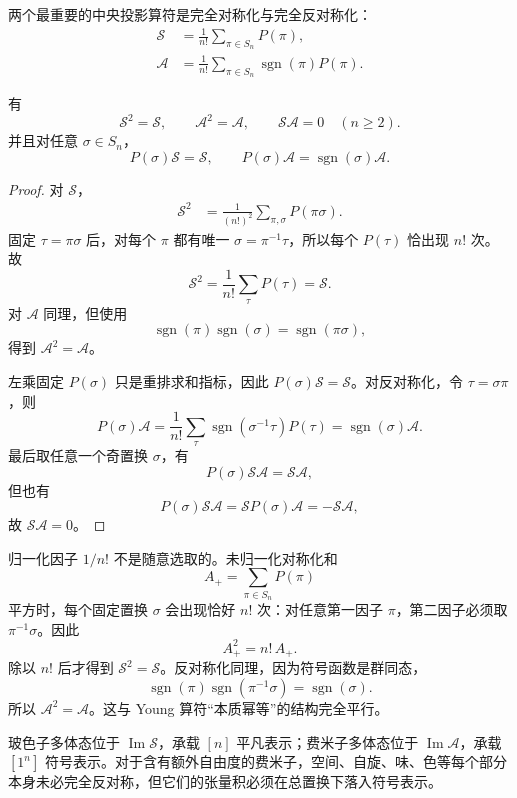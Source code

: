 两个最重要的中央投影算符是完全对称化与完全反对称化：
\begin{align}
\mathcal S
&=\frac1{n!}\sum_{\pi\in S_n}P(\pi),\label{eq:symmetrizer}\\
\mathcal A
&=\frac1{n!}\sum_{\pi\in S_n}\operatorname{sgn}(\pi)P(\pi).
\label{eq:antisymmetrizer}
\end{align}

\begin{proposition}[完全对称化与反对称化确为投影]
有
\[
\mathcal S^2=\mathcal S,
\qquad
\mathcal A^2=\mathcal A,
\qquad
\mathcal S\mathcal A=0\quad(n\ge2).
\]
并且对任意 $\sigma\in S_n$，
\[
P(\sigma)\mathcal S=\mathcal S,
\qquad
P(\sigma)\mathcal A=\operatorname{sgn}(\sigma)\mathcal A.
\]

\end{proposition}

\begin{proof}
对 $\mathcal S$，
\begin{align*}
\mathcal S^2
&=\frac1{(n!)^2}\sum_{\pi,\sigma}P(\pi\sigma).
\end{align*}
固定 $\tau=\pi\sigma$ 后，对每个 $\pi$ 都有唯一 $\sigma=\pi^{-1}\tau$，所以每个 $P(\tau)$ 恰出现 $n!$ 次。故
\[
\mathcal S^2=\frac1{n!}\sum_\tau P(\tau)=\mathcal S.
\]
对 $\mathcal A$ 同理，但使用
\[
\operatorname{sgn}(\pi)\operatorname{sgn}(\sigma)=\operatorname{sgn}(\pi\sigma),
\]
得到 $\mathcal A^2=\mathcal A$。

左乘固定 $P(\sigma)$ 只是重排求和指标，因此 $P(\sigma)\mathcal S=\mathcal S$。对反对称化，令 $\tau=\sigma\pi$，则
\[
P(\sigma)\mathcal A
=\frac1{n!}\sum_\tau
\operatorname{sgn}(\sigma^{-1}\tau)P(\tau)
=\operatorname{sgn}(\sigma)\mathcal A.
\]
最后取任意一个奇置换 $\sigma$，有
\[
P(\sigma)\mathcal S\mathcal A=\mathcal S\mathcal A,
\]
但也有
\[
P(\sigma)\mathcal S\mathcal A
=\mathcal S P(\sigma)\mathcal A
=-\mathcal S\mathcal A,
\]
故 $\mathcal S\mathcal A=0$。
\end{proof}

归一化因子 $1/n!$ 不是随意选取的。未归一化对称化和
\[
A_+=\sum_{\pi\in S_n}P(\pi)
\]
平方时，每个固定置换 $\sigma$ 会出现恰好 $n!$ 次：对任意第一因子 $\pi$，第二因子必须取 $\pi^{-1}\sigma$。因此
\[
A_+^2=n!\,A_+.
\]
除以 $n!$ 后才得到 $\mathcal S^2=\mathcal S$。反对称化同理，因为符号函数是群同态，
\[
\operatorname{sgn}(\pi)\operatorname{sgn}(\pi^{-1}\sigma)=\operatorname{sgn}(\sigma).
\]
所以 $\mathcal A^2=\mathcal A$。这与 Young 算符“本质幂等”的结构完全平行。


玻色子多体态位于 $\operatorname{Im}\mathcal S$，承载 $[n]$ 平凡表示；费米子多体态位于 $\operatorname{Im}\mathcal A$，承载 $[1^n]$ 符号表示。对于含有额外自由度的费米子，空间、自旋、味、色等每个部分本身未必完全反对称，但它们的张量积必须在总置换下落入符号表示。


